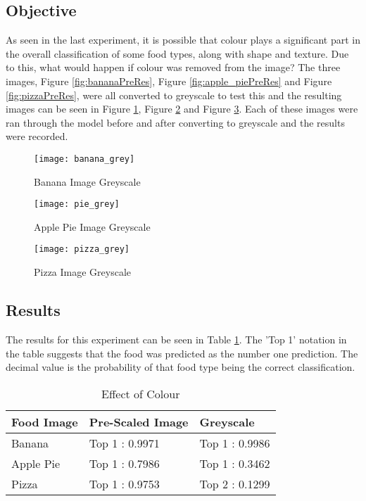 \tocless\subsection{Objective}
As seen in the last experiment, it is possible that colour plays a significant part in the overall classification of some food types, along with shape and texture. Due to this, what would happen if colour was removed from the image? The three images, Figure \ref{fig:bananaPreRes}, Figure \ref{fig:apple_piePreRes} and Figure \ref{fig:pizzaPreRes}, were all converted to greyscale to test this and the resulting images can be seen in Figure \ref{fig:bananaGrey}, Figure \ref{fig:applePieGrey} and Figure \ref{fig:pizzaGrey}. Each of these images were ran through the model before and after converting to greyscale and the results were recorded.

\begin{figure}[h]
	\centering
    \texttt{[image: banana\_grey]}
    \caption{Banana Image Greyscale}
    \label{fig:bananaGrey}
\end{figure}

\begin{figure}[h]
	\centering
    \texttt{[image: pie\_grey]}
    \caption{Apple Pie Image Greyscale}
    \label{fig:applePieGrey}
\end{figure}

\begin{figure}[h]
	\centering
    \texttt{[image: pizza\_grey]}
    \caption{Pizza Image Greyscale}
    \label{fig:pizzaGrey}
\end{figure}

\tocless\subsection{Results}
The results for this experiment can be seen in Table \ref{colour}.
The 'Top 1' notation in the table suggests that the food was predicted as the number one prediction. The decimal value is the probability of that food type being the correct classification.

\begin{table}[]
\centering
\caption{Effect of Colour}
\label{colour}
\begin{tabular}{|l|l|l|}
\hline
\textbf{Food Image} & \textbf{Pre-Scaled Image} & \textbf{Greyscale}      \\ \hline
Banana     & Top 1 : 0.9971   & Top 1 : 0.9986 \\ \hline
Apple Pie  & Top 1 : 0.7986   & Top 1 : 0.3462   \\ \hline
Pizza      & Top 1 : 0.9753   & Top 2 : 0.1299 \\ \hline
\end{tabular}
\end{table}

